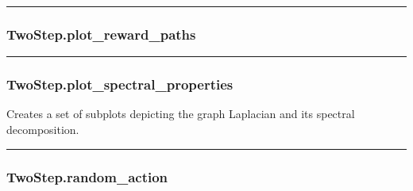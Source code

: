 \begin{center}\rule{0.5\linewidth}{\linethickness}\end{center}

\subsubsection{TwoStep.plot\_reward\_paths}\label{twostep.plot_reward_paths}

\begin{Shaded}
\begin{Highlighting}[]
\OperatorTok{=}\OperatorTok{=}\OperatorTok{=}\NormalTok{)}
\end{Highlighting}
\end{Shaded}

\begin{center}\rule{0.5\linewidth}{\linethickness}\end{center}

\subsubsection{TwoStep.plot\_spectral\_properties}\label{twostep.plot_spectral_properties}

\begin{Shaded}
\begin{Highlighting}[]
\OperatorTok{=}\OperatorTok{=}\OperatorTok{=}\NormalTok{)}
\end{Highlighting}
\end{Shaded}

Creates a set of subplots depicting the graph Laplacian and its spectral
decomposition.

\begin{center}\rule{0.5\linewidth}{\linethickness}\end{center}

\subsubsection{TwoStep.random\_action}\label{twostep.random_action}

\begin{Shaded}
\begin{Highlighting}[]
\NormalTok{)}
\end{Highlighting}
\end{Shaded}

